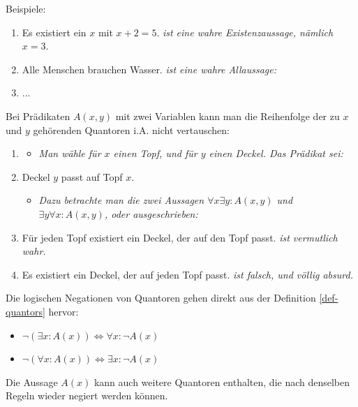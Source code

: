 \begin{example}
    Beispiele:
    \begin{enumerate}
        \item Es existiert ein $x$ mit $x + 2 = 5$. \hfill \emph{ist eine wahre Existenzaussage, nämlich $x = 3$.}
        \item Alle Menschen brauchen Wasser. \hfill \emph{ist eine wahre Allaussage:}
        \item ...
    \end{enumerate}
    Bei Prädikaten $A(x, y)$ mit zwei Variablen kann man die Reihenfolge der zu $x$ und $y$ gehörenden Quantoren i.A. nicht vertauschen:
    \begin{enumerate}[resume]
        \item \begin{itemize}[label=]
            \item \emph{Man wähle für $x$ einen Topf, und für $y$ einen Deckel. Das Prädikat sei:}
        \end{itemize}
        \item[] Deckel $y$ passt auf Topf $x$.
        \begin{itemize}[label=]
            \item \emph{Dazu betrachte man die zwei Aussagen $\forall x \exists y\!: A(x,y)$ und $\exists y \forall x\!: A(x,y)$, oder ausgeschrieben:}
        \end{itemize}
        \item[] Für jeden Topf existiert ein Deckel, der auf den Topf passt. \hfill \emph{ist vermutlich wahr.}
        \item[] Es existiert ein Deckel, der auf jeden Topf passt. \hfill \emph{ist falsch, und völlig absurd.}
    \end{enumerate}
\end{example}

\begin{shadedbox}
    \begin{remark}
        Die logischen Negationen von Quantoren gehen direkt aus der Definition \ref{def-quantors} hervor:
        \begin{itemize}
            \item $\neg (\exists x\!: A(x)) \iff \forall x\!: \neg A(x)$
            \item $\neg (\forall x\!: A(x)) \iff \exists x\!: \neg A(x)$
        \end{itemize}
        Die Aussage $A(x)$ kann auch weitere Quantoren enthalten, die nach denselben Regeln wieder negiert werden können.
    \end{remark}
\end{shadedbox}

